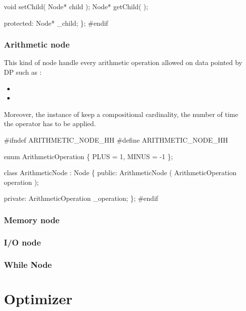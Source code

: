                 void setChild( Node* child );
                Node* getChild( );

        protected:
                Node* _child;
\};
#endif
\nwendcode{}\nwdocspar

\subsubsection{Arithmetic node}
This kind of node handle every arithmetic operation allowed on data pointed by \gls{DP} such as :
\begin{itemize}
        \item {}
        \item {}
\end{itemize}

Moreover, the instance of  keep a compositional cardinality, \ie the number of time the operator has to be applied.


\nwenddocs{}\endmoddef\nwstartdeflinemarkup\nwenddeflinemarkup
#ifndef ARITHMETIC_NODE_HH
#define ARITHMETIC_NODE_HH

enum ArithmeticOperation \{ 
        PLUS    = 1,
        MINUS   = -1
\};

class ArithmeticNode : Node \{
        public:
                ArithmeticNode ( ArithmeticOperation operation );

        private:
                ArithmeticOperation _operation;
\};
#endif
\nwendcode{}\nwdocspar

\subsubsection{Memory node}

\subsubsection{I/O node}

\subsubsection{While Node}
\nwenddocs{}\section{Optimizer}

